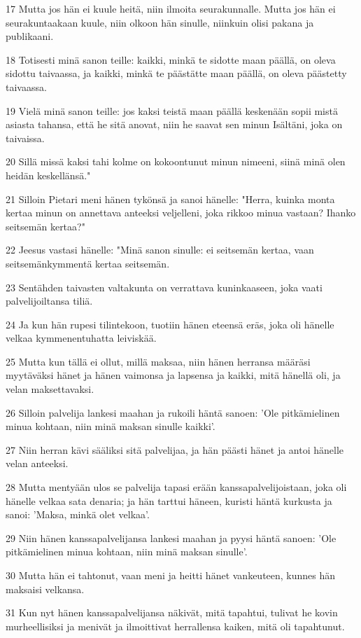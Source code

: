 \par 17 Mutta jos hän ei kuule heitä, niin ilmoita seurakunnalle. Mutta jos hän ei seurakuntaakaan kuule, niin olkoon hän sinulle, niinkuin olisi pakana ja publikaani.
\par 18 Totisesti minä sanon teille: kaikki, minkä te sidotte maan päällä, on oleva sidottu taivaassa, ja kaikki, minkä te päästätte maan päällä, on oleva päästetty taivaassa.
\par 19 Vielä minä sanon teille: jos kaksi teistä maan päällä keskenään sopii mistä asiasta tahansa, että he sitä anovat, niin he saavat sen minun Isältäni, joka on taivaissa.
\par 20 Sillä missä kaksi tahi kolme on kokoontunut minun nimeeni, siinä minä olen heidän keskellänsä."
\par 21 Silloin Pietari meni hänen tykönsä ja sanoi hänelle: "Herra, kuinka monta kertaa minun on annettava anteeksi veljelleni, joka rikkoo minua vastaan? Ihanko seitsemän kertaa?"
\par 22 Jeesus vastasi hänelle: "Minä sanon sinulle: ei seitsemän kertaa, vaan seitsemänkymmentä kertaa seitsemän.
\par 23 Sentähden taivasten valtakunta on verrattava kuninkaaseen, joka vaati palvelijoiltansa tiliä.
\par 24 Ja kun hän rupesi tilintekoon, tuotiin hänen eteensä eräs, joka oli hänelle velkaa kymmenentuhatta leiviskää.
\par 25 Mutta kun tällä ei ollut, millä maksaa, niin hänen herransa määräsi myytäväksi hänet ja hänen vaimonsa ja lapsensa ja kaikki, mitä hänellä oli, ja velan maksettavaksi.
\par 26 Silloin palvelija lankesi maahan ja rukoili häntä sanoen: 'Ole pitkämielinen minua kohtaan, niin minä maksan sinulle kaikki'.
\par 27 Niin herran kävi sääliksi sitä palvelijaa, ja hän päästi hänet ja antoi hänelle velan anteeksi.
\par 28 Mutta mentyään ulos se palvelija tapasi erään kanssapalvelijoistaan, joka oli hänelle velkaa sata denaria; ja hän tarttui häneen, kuristi häntä kurkusta ja sanoi: 'Maksa, minkä olet velkaa'.
\par 29 Niin hänen kanssapalvelijansa lankesi maahan ja pyysi häntä sanoen: 'Ole pitkämielinen minua kohtaan, niin minä maksan sinulle'.
\par 30 Mutta hän ei tahtonut, vaan meni ja heitti hänet vankeuteen, kunnes hän maksaisi velkansa.
\par 31 Kun nyt hänen kanssapalvelijansa näkivät, mitä tapahtui, tulivat he kovin murheellisiksi ja menivät ja ilmoittivat herrallensa kaiken, mitä oli tapahtunut.
